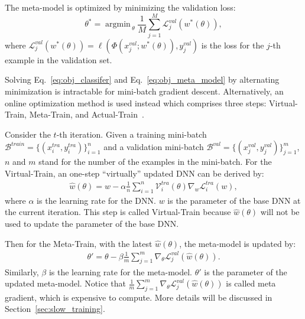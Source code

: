 \documentclass[final]{cvpr}
\newcommand{\argmin}{\mathop{\mathrm{argmin\,}}}
\begin{document}
The meta-model is optimized by minimizing the validation loss:
\begin{equation}\label{eq:obj_meta_model}
    \theta^{*} = \argmin_{\theta} 
    \frac{1}{M}\sum_{j=1}^{M}\mathcal{L}_j^{val}(w^{*}(\theta)),
\end{equation}
where $\mathcal{L}_j^{val}(w^{*}(\theta))=\ell(\Phi(x_j^{val}; w^{*}(\theta)), y_j^{val})$ is the loss for the $j$-th example in the validation set.


Solving Eq.~\eqref{eq:obj_classifer} and Eq.~\eqref{eq:obj_meta_model} by alternating minimization is intractable for mini-batch gradient descent. Alternatively, an online optimization method is used instead which comprises three steps: Virtual-Train, Meta-Train, and Actual-Train~\cite{wei2020combating}. 

Consider the $t$-th iteration. Given a training mini-batch $\mathcal{B}^{train}=\{(x_i^{tra}, y_i^{tra})\}_{i=1}^{n}$ and a validation mini-batch $\mathcal{B}^{val}=\{(x_j^{val}, y_j^{val})\}_{j=1}^{m}$, $n$ and $m$ stand for the number of the examples in the mini-batch. 
For the Virtual-Train, an one-step ``virtually'' updated DNN can be derived by:
\begin{equation}\label{eq:virtual_train}
\begin{split}
    \hat{w}(\theta) = w - \alpha \frac{1}{n} \sum_{i=1}^{n}\mathcal{V}_i^{tra}(\theta)\nabla_{w}\mathcal{L}_i^{tra}(w),
\end{split}
\end{equation}
where $\alpha$ is the learning rate for the DNN. $w$ is the parameter of the base DNN at the current iteration. This step is called Virtual-Train because $\hat{w}(\theta)$ will not be used to update the parameter of the base DNN. 

Then for the Meta-Train, with the latest $\hat{w}(\theta)$, the meta-model is updated by:
\begin{equation}\label{eq:meta_train}
\begin{split}
    \theta' = \theta - \beta \frac{1}{m}\sum_{j=1}^{m}\nabla_{\theta}\mathcal{L}_j^{val}(\hat{w}(\theta)).
\end{split}
\end{equation}
Similarly, $\beta$ is the learning rate for the meta-model. $\theta'$ is the parameter of the updated meta-model.
Notice that $\frac{1}{m}\sum_{j=1}^{m}\nabla_{\theta}\mathcal{L}_j^{val}(\hat{w}(\theta))$ is called meta gradient, which is expensive to compute. More details will be discussed in Section~\ref{sec:slow_training}. 
\end{document}

